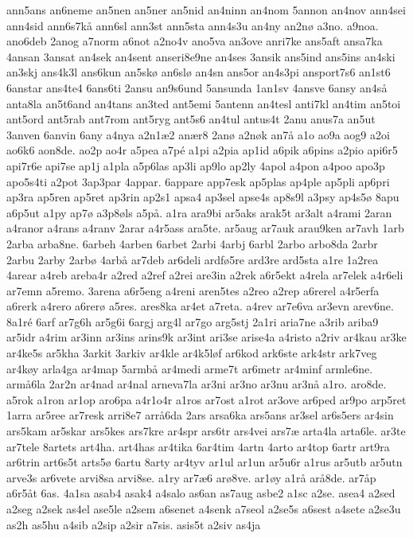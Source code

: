 {ann5ans
an6neme
an5nen
an5ner
an5nid
an4ninn
an4nom
5annon
an4nov
ann4sei
ann4sid
ann6s7kå
ann6sl
ann3st
ann5sta
ann4s3u
an4ny
an2nø
a3no.
a9noa.
ano6deb
2anog
a7norm
a6not
a2no4v
ano5va
an3ove
anri7ke
ans5aft
ansa7ka
4ansan
3ansat
an4sek
an4sent
anseri8e9ne
an4ses
3ansik
ans5ind
ans5ins
an4ski
an3skj
ans4k3l
ans6kun
an5skø
an6slø
an4sn
ans5or
an4s3pi
ansport7s6
an1st6
6anstar
ans4te4
6ans6ti
2ansu
an9s6und
5ansunda
1an1sv
4ansve
6ansy
an4så
anta8la
an5t6and
an4tans
an3ted
ant5emi
5antenn
an4tesl
anti7kl
an4tim
an5toi
ant5ord
ant5rab
ant7rom
ant5ryg
ant5s6
an4tul
antus4t
2anu
anus7a
an5ut
3anven
6anvin
6any
a4nya
a2n1æ2
anær8
2anø
a2nøk
an7å
a1o
ao9a
aog9
a2oi
ao6k6
aon8de.
ao2p
ao4r
a5pea
a7pé
a1pi
a2pia
ap1id
a6pik
a6pins
a2pio
api6r5
api7r6e
api7se
ap1j
a1pla
a5p6las
ap3li
ap9lo
ap2ly
4apol
a4pon
a4poo
apo3p
apo5s4ti
a2pot
3ap3par
4appar.
6appare
app7esk
ap5plas
ap4ple
ap5pli
ap6pri
ap3ra
ap5ren
ap5ret
ap3rin
ap2s1
apsa4
ap3sel
apse4s
ap8s9l
a3psy
ap4s5ø
8apu
a6p5ut
a1py
ap7ø
a3p8øls
a5på.
a1ra
ara9bi
ar5aks
arak5t
ar3alt
a4rami
2aran
a4ranor
a4rans
a4ranv
2arar
a4r5ass
ara5te.
ar5aug
ar7auk
arau9ken
ar7avh
1arb
2arba
arba8ne.
6arbeh
4arben
6arbet
2arbi
4arbj
6arbl
2arbo
arbo8da
2arbr
2arbu
2arby
2arbø
4arbå
ar7deb
ar6deli
ardfø5re
ard3re
ard5sta
a1re
1a2rea
4arear
a4reb
areba4r
a2red
a2ref
a2rei
are3in
a2rek
a6r5ekt
a4rela
ar7elek
a4r6eli
ar7emn
a5remo.
3arena
a6r5eng
a4reni
aren5tes
a2reo
a2rep
a6rerel
a4r5erfa
a6rerk
a4rero
a6rerø
a5res.
ares8ka
ar4et
a7reta.
a4rev
ar7e6va
ar3evn
arev6ne.
8a1ré
6arf
ar7g6h
ar5g6i
6argj
arg4l
ar7go
arg5stj
2a1ri
aria7ne
a3rib
ariba9
ar5idr
a4rim
ar3inn
ar3ins
arins9k
ar3int
ari3se
arise4a
a4risto
a2riv
ar4kau
ar3ke
ar4ke5s
ar5kha
3arkit
3arkiv
ar4kle
ar4k5løf
ar6kod
ark6ste
ark4str
ark7veg
ar4køy
arla4ga
ar4map
5armbå
ar4medi
arme7t
ar6metr
ar4minf
armle6ne.
armå6la
2ar2n
ar4nad
ar4nal
arneva7la
ar3ni
ar3no
ar3nu
ar3nå
a1ro.
aro8de.
a5rok
a1ron
ar1op
aro6pa
a4r1o4r
a1ros
ar7ost
a1rot
ar3ove
ar6ped
ar9po
arp5ret
1arra
ar5ree
ar7resk
arri8e7
arrå6da
2ars
arsa6ka
ars5ans
ar3sel
ar6s5ers
ar4sin
ars5kam
ar5skar
ars5kes
ars7kre
ar4spr
ars6tr
ars4vei
ars7æ
arta4la
arta6le.
ar3te
ar7tele
8artets
art4ha.
art4has
ar4tika
6ar4tim
4artn
4arto
ar4top
6artr
art9ra
ar6trin
art6s5t
arts5ø
6artu
8arty
ar4tyv
ar1ul
ar1un
ar5u6r
a1rus
ar5utb
ar5utn
arve3s
ar6vete
arvi8sa
arvi8se.
a1ry
ar7æ6
arø8ve.
ar1øy
a1rå
arå8de.
ar7åp
a6r5åt
6as.
4a1sa
asab4
asak4
a4salo
as6an
as7aug
asbe2
a1sc
a2se.
asea4
a2sed
a2seg
a2sek
as4el
ase5le
a2sem
a6senet
a4senk
a7seol
a2se5s
a6sest
a4sete
a2se3u
as2h
as5hu
a4sib
a2sip
a2sir
a7sis.
asis5t
a2siv
as4ja
}
